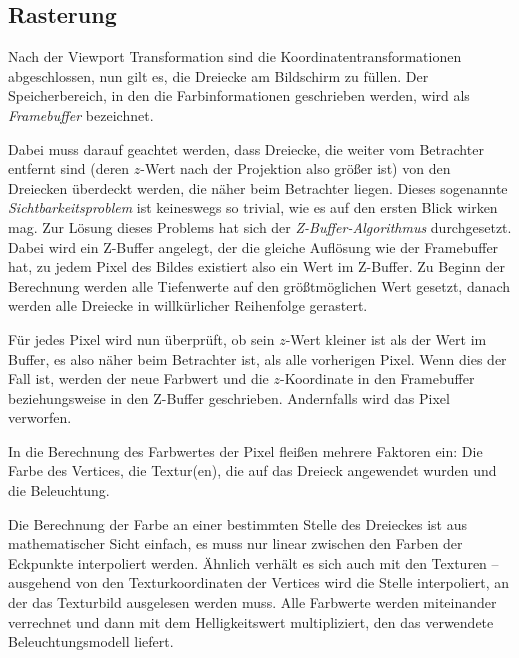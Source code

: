 \subsection{Rasterung}
Nach der Viewport Transformation sind die Koordinatentransformationen abgeschlossen, nun gilt es, die Dreiecke am Bildschirm zu füllen. Der Speicherbereich, in den die Farbinformationen geschrieben werden, wird als \emph{Framebuffer} bezeichnet.

Dabei muss darauf geachtet werden, dass Dreiecke, die weiter vom Betrachter entfernt sind (deren $z$-Wert nach der Projektion also größer ist) von den Dreiecken überdeckt werden, die näher beim Betrachter liegen. Dieses sogenannte \emph{Sichtbarkeitsproblem} ist keineswegs so trivial, wie es auf den ersten Blick wirken mag. Zur Lösung dieses Problems hat sich der \emph{Z-Buffer-Algorithmus} durchgesetzt. Dabei wird ein Z-Buffer angelegt, der die gleiche Auflösung wie der Framebuffer hat, zu jedem Pixel des Bildes existiert also ein Wert im Z-Buffer. Zu Beginn der Berechnung werden alle Tiefenwerte auf den größtmöglichen Wert gesetzt, danach werden alle Dreiecke in willkürlicher Reihenfolge gerastert.

Für jedes Pixel wird nun überprüft, ob sein $z$-Wert kleiner ist als der Wert im Buffer, es also näher beim Betrachter ist, als alle vorherigen Pixel. Wenn dies der Fall ist, werden der neue Farbwert und die $z$-Koordinate in den Framebuffer beziehungsweise in den Z-Buffer geschrieben. Andernfalls wird das Pixel verworfen.

In die Berechnung des Farbwertes der Pixel fleißen mehrere Faktoren ein: Die Farbe des Vertices, die Textur(en), die auf das Dreieck angewendet wurden und die Beleuchtung.

\label{lighting}
Die Berechnung der Farbe an einer bestimmten Stelle des Dreieckes ist aus mathematischer Sicht einfach, es muss nur linear zwischen den Farben der Eckpunkte interpoliert werden. Ähnlich verhält es sich auch mit den Texturen -- ausgehend von den Texturkoordinaten der Vertices wird die Stelle interpoliert, an der das Texturbild ausgelesen werden muss. Alle Farbwerte werden miteinander verrechnet und dann mit dem Helligkeitswert multipliziert, den das verwendete Beleuchtungsmodell liefert.


